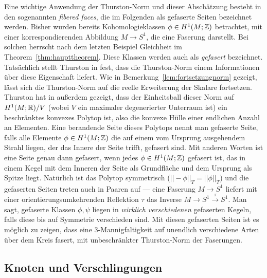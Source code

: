     \begin{bsp}
    \label{ex:fiberedfaces}
        Eine wichtige Anwendung der Thurston-Norm und dieser Abschätzung besteht in den sogenannten \textit{fibered faces}, die im Folgenden als gefaserte Seiten bezeichnet werden. Bisher wurden bereits Kohomologieklassen $\phi \in H^1(M;\mathbb{Z})$ betrachtet, mit einer korrespondierenden Abbildung $M \to S^1$, die eine Faserung darstellt. Bei solchen herrscht nach dem letzten Beispiel Gleichheit im Theorem~\ref{thm:haupttheorem}. Diese Klassen werden auch als \textit{gefasert} bezeichnet. Tatsächlich stellt Thurston in \cite{Thurston.1986} fest, dass die Thurston-Norm einem Informationen über diese Eigenschaft liefert. Wie in Bemerkung~\ref{lem:fortsetzungnorm} gezeigt, lässt sich die Thurston-Norm auf die reelle Erweiterung der Skalare fortsetzen. Thurston hat in \cite{Thurston.1986} außerdem gezeigt, dass der Einheitsball dieser Norm auf $H^1(M;\mathbb{R})/V$ (wobei $V$ ein maximaler degenerierter Unterraum ist) ein beschränktes konvexes Polytop ist, also die konvexe Hülle einer endlichen Anzahl an Elementen. Eine berandende Seite dieses Polytops nennt man gefaserte Seite, falls alle Elemente $\phi \in H^1(M;\mathbb{Z})$ die auf einem vom Ursprung ausgehendem Strahl liegen, der das Innere der Seite trifft, gefasert sind. Mit anderen Worten ist eine Seite genau dann gefasert, wenn jedes $\phi \in H^1(M;\mathbb{Z})$ gefasert ist, das in einem Kegel mit dem Inneren der Seite als Grundfläche und dem Ursprung als Spitze liegt. Natürlich ist das Polytop symmetrisch ($||-\phi||_T=||\phi||_T$) und die gefaserten Seiten treten auch in Paaren auf --- eine Faserung $M \to S^1$ liefert mit einer orientierungsumkehrenden Reflektion $\tau$ das Inverse $M \to S^1 \stackrel \tau \to S^1$. Man sagt, gefaserte Klassen $\phi,\psi$ liegen in \textit{wirklich verschiedenen} gefaserten Kegeln, falls diese bis auf Symmetrie verschieden sind. Mit diesen gefaserten Seiten ist es möglich zu zeigen, dass eine 3-Mannigfaltigkeit auf unendlich verschiedene Arten über dem Kreis fasert, mit unbeschränkter Thurston-Norm der Faserungen.
    \end{bsp}


    \subsection{Knoten und Verschlingungen}
    \label{sec:links}

